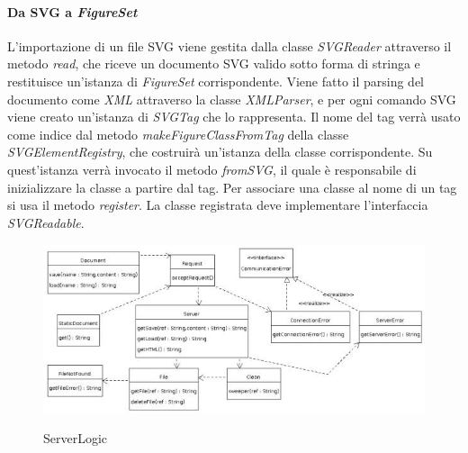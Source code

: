 \paragraph{Da SVG a \textit{FigureSet}}
L'importazione di un file SVG viene gestita dalla classe \textit{SVGReader} attraverso il metodo \textit{read}, che riceve un documento SVG valido sotto forma di stringa e restituisce un'istanza di \textit{FigureSet} corrispondente. Viene fatto il parsing del documento come \textit{XML} attraverso la classe \textit{XMLParser}, e per ogni comando SVG viene creato un'istanza di \textit{SVGTag} che lo rappresenta. Il nome del tag verr\`a usato come indice dal metodo \textit{makeFigureClassFromTag} della classe \textit{SVGElementRegistry}, che costruir\`a un'istanza della classe corrispondente. Su quest'istanza verr\`a invocato il metodo \textit{fromSVG}, il quale \`e responsabile di inizializzare la classe a partire dal tag. Per associare una classe al nome di un tag si usa il metodo \textit{register}. La classe registrata deve implementare l'interfaccia \textit{SVGReadable}.

\newpage
{}
\begin{figure}[!ht]
\centering
\includegraphics{ServerLogic.jpg}\\
\caption{ServerLogic}
\end{figure}


